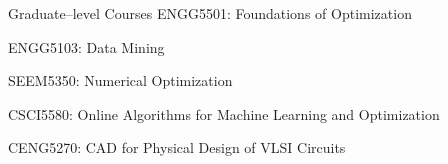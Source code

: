 \begin{rSection}{Graduate--level Courses}
    ENGG5501: Foundations of Optimization

    ENGG5103: Data Mining 

    SEEM5350: Numerical Optimization 

    CSCI5580: Online Algorithms for Machine Learning and Optimization 

    CENG5270: CAD for Physical Design of VLSI Circuits
\end{rSection}
